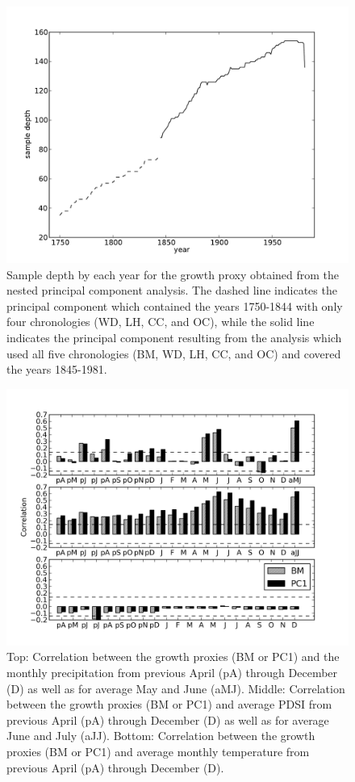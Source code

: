 \begin{figure}
\centering
\includegraphics[width=5in]{figures/sample_depth.pdf}
\caption{Sample depth by each year for the growth proxy obtained from the nested principal component analysis. The dashed line indicates the principal component which contained the years 1750-1844 with only four chronologies (WD, LH, CC, and OC), while the solid line indicates the principal component resulting from the analysis which used all five chronologies (BM, WD, LH, CC, and OC) and covered the years 1845-1981.}
\label{fig:sampleDepth}
\end{figure}

\begin{figure}
\centering
\includegraphics[width=5in]{figures/climCorr.png}
\caption{Top: Correlation between the growth proxies (BM or PC1) and the monthly precipitation from previous April (pA) through December (D) as well as for average May and June (aMJ). Middle: Correlation between the growth proxies (BM or PC1) and average PDSI from previous April (pA) through December (D) as well as for average June and July (aJJ). Bottom: Correlation between the growth proxies (BM or PC1) and average monthly temperature from previous April (pA) through December (D).}
\label{fig:climCorr}
\end{figure}

